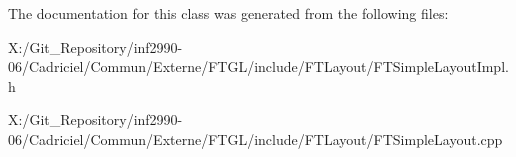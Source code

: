 The documentation for this class was generated from the following files\-:\begin{DoxyCompactItemize}
\item 
X\-:/\-Git\-\_\-\-Repository/inf2990-\/06/\-Cadriciel/\-Commun/\-Externe/\-F\-T\-G\-L/include/\-F\-T\-Layout/F\-T\-Simple\-Layout\-Impl.\-h\item 
X\-:/\-Git\-\_\-\-Repository/inf2990-\/06/\-Cadriciel/\-Commun/\-Externe/\-F\-T\-G\-L/include/\-F\-T\-Layout/F\-T\-Simple\-Layout.\-cpp\end{DoxyCompactItemize}
